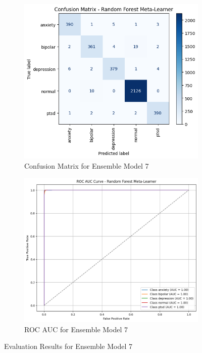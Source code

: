 \begin{figure}[h!]
    \centering
    \begin{subfigure}[b]{0.49\textwidth}
        \centering
        \includegraphics[width=\textwidth]{Images/EM T CM.png}
        \caption{Confusion Matrix for Ensemble Model 7}
        \label{em_t cm}  %
    \end{subfigure}
    \hfill
    \begin{subfigure}[b]{0.49\textwidth}
        \centering
        \includegraphics[width=\textwidth]{Images/EM T ROC.png}
        \caption{ROC AUC for Ensemble Model 7}
        \label{em_t roc}  %
    \end{subfigure}
    \caption{Evaluation Results for Ensemble Model 7}
    \label{fig:ensemble_model7_comparison}
\end{figure}

